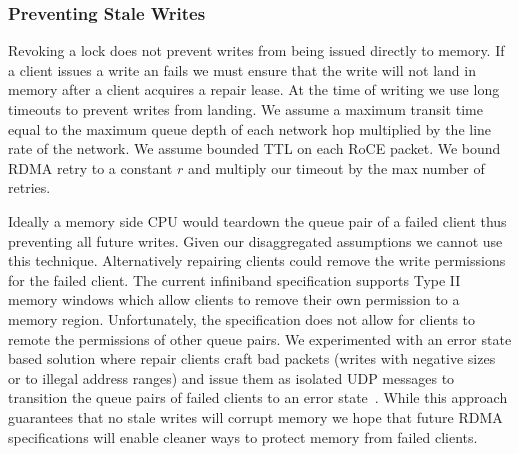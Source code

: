 \subsubsection{Preventing Stale Writes}

Revoking a lock does not prevent writes from being issued
directly to memory. If a client issues a write an fails we
must ensure that the write will not land in memory after a
client acquires a repair lease. At the time of writing we
use long timeouts to prevent writes from landing. We assume
a maximum transit time equal to the maximum queue depth of
each network hop multiplied by the line rate of the network.
We assume bounded TTL on each RoCE packet. We bound RDMA
retry to a constant $r$ and multiply our timeout by the max
number of retries.

Ideally a memory side CPU would teardown the queue pair of a
failed client thus preventing all future writes. Given our
disaggregated assumptions we cannot use this technique.
Alternatively repairing clients could remove the write
permissions for the failed client. The current infiniband
specification supports Type II memory windows which allow
clients to remove their own permission to a memory region.
Unfortunately, the specification does not allow for clients
to remote the permissions of other queue pairs. We
experimented with an error state based solution where repair
clients craft bad packets (writes with negative sizes or to
illegal address ranges) and issue them as isolated UDP
messages to transition the queue pairs of failed clients to
an error state~\cite{redmark}. While this approach
guarantees that no stale writes will corrupt memory we hope
that future RDMA specifications will enable cleaner ways to
protect memory from failed clients.



